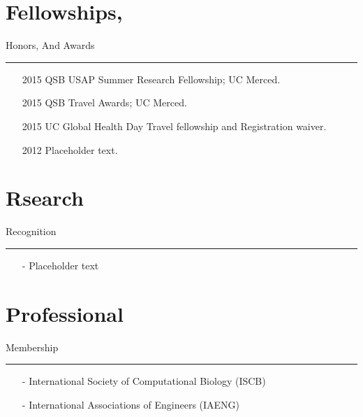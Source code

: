 \documentclass[line,margin]{cv_type2}
\begin{document}
\begin{resume}
\section{Fellowships,}\hskip 81pt {\large \sc Honors,} {\large \sc And }{\large \sc Awards}\hskip 4pt {\color {gray} \hfill \rule {9.8cm} {0.1pt}}
\begin{itemize}
\vskip 3pt
\end{itemize}
                \begin{itemize}
                \item[\color{gray} 2015] 
                 {QSB USAP Summer Research Fellowship}; UC Merced.
                \item[\color{gray} 2015]
                 {QSB Travel Awards}; UC Merced.
                \item[\color{gray} 2015]
                 {UC Global Health Day Travel fellowship and Registration waiver.}
                \item[\color{gray} 2012]
                 {Placeholder text.}
                \end{itemize}
\vskip 10pt

\section{Rsearch}\hskip 52pt {\large \sc Recognition} \hskip 4pt {\color {gray} \hfill \rule {11.4cm} {0.1pt}}
\begin{itemize}
\vskip 3pt
\end{itemize}
                \begin{itemize}
                \item[- ]
                Placeholder text
                \end{itemize}

\vskip 10pt

\section{Professional}\hskip 83pt {\large \sc Membership} \hskip 4pt {\color {gray} \hfill \rule {11.4cm} {0.1pt}}
\begin{itemize}
\vskip 3pt
\end{itemize}
                \begin{itemize}
                    \item[- ]
                    {International Society of Computational Biology}{\small{ (ISCB)}}
                    \item[- ]
                    {International Associations of Engineers}{\small{ (IAENG)}}
                \end{itemize}
                
\end{resume}
\end{document}

